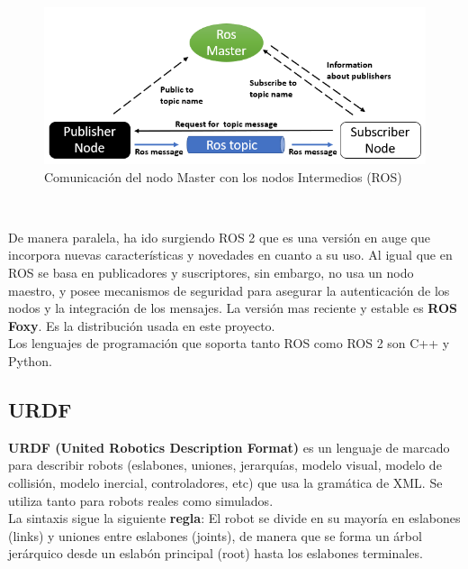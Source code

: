 \begin{figure} [h!]
  \begin{center}
    \includegraphics[width=15cm]{imagenes/ros_master_communication.png}
  \end{center}
  \caption{Comunicación del nodo Master con los nodos Intermedios (ROS)}
  \label{fig:ros_master_comunicación}
\end{figure}\

De manera paralela, ha ido surgiendo ROS 2 que es una versión en auge que incorpora nuevas características y novedades en cuanto a su uso. Al igual que en ROS se basa en publicadores y suscriptores, sin embargo, no usa un nodo maestro, y posee mecanismos de seguridad para asegurar la autenticación de los nodos y la integración de los mensajes. La versión mas reciente y estable es \textbf{ROS Foxy}. Es la distribución usada en este proyecto.\\

Los lenguajes de programación que soporta tanto ROS como ROS 2 son C++ y Python.\\

\subsection{URDF}
\label{sec:urdf}

\textbf{URDF (United Robotics Description Format)} es un lenguaje de marcado para describir robots (eslabones, uniones, jerarquías, modelo visual, modelo de collisión, modelo inercial, controladores, etc) que usa la gramática de XML. Se utiliza tanto para robots reales como simulados.\\

La sintaxis sigue la siguiente \textbf{regla}: El robot se divide en su mayoría en eslabones (links) y uniones entre eslabones (joints), de manera que se forma un árbol jerárquico desde un eslabón principal (root) hasta los eslabones terminales.\\

